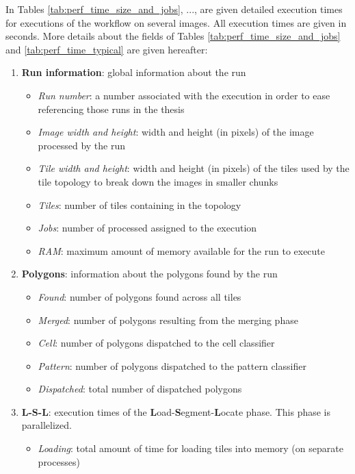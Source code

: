 \label{app:exec_times}
In Tables \ref{tab:perf_time_size_and_jobs}, ..., are given detailed execution times for executions of the workflow on several images. All execution times are given in seconds. More details about the fields of Tables \ref{tab:perf_time_size_and_jobs} and \ref{tab:perf_time_typical} are given hereafter:

\begin{enumerate}
	\item \textbf{Run information}: global information about the run
	\begin{itemize}
		\item \textit{Run number}: a number associated with the execution in order to ease referencing those runs in the thesis
		\item \textit{Image width and height}: width and height (in pixels) of the image processed by the run
		\item \textit{Tile width and height}: width and height (in pixels) of the tiles used by the tile topology to break down the images in smaller chunks
		\item \textit{Tiles}: number of tiles containing in the topology
		\item \textit{Jobs}: number of processed assigned to the execution
		\item \textit{RAM}: maximum amount of memory available for the run to execute
	\end{itemize}
	\item \textbf{Polygons}: information about the polygons found by the run
	\begin{itemize}
		\item \textit{Found}: number of polygons found across all tiles 
		\item \textit{Merged}: number of polygons resulting from the merging phase
		\item \textit{Cell}: number of polygons dispatched to the cell classifier
		\item \textit{Pattern}: number of polygons dispatched to the pattern classifier
		\item \textit{Dispatched}: total number of dispatched polygons
	\end{itemize}
	\item \textbf{L-S-L}: execution times of the \textbf{L}oad-\textbf{S}egment-\textbf{L}ocate phase. This phase is parallelized.
	\begin{itemize}
		\item \textit{Loading}: total amount of time for loading tiles into memory (on separate processes)

\end{itemize}
\end{enumerate}
